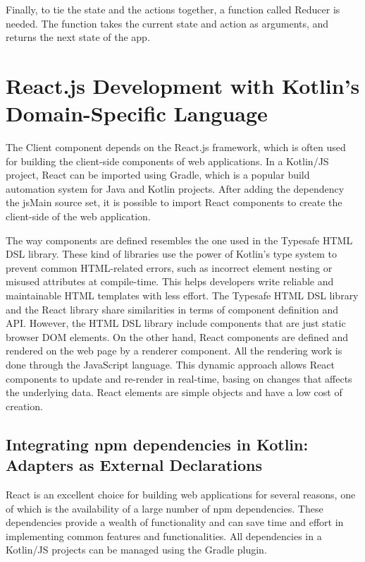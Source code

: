Finally, to tie the state and the actions together, a function called Reducer is needed. The function takes the current state and action as arguments, and returns the next state of the app.

\section{React.js Development with Kotlin's Domain-Specific Language}
\label{sec:react-js-development-with-kotlin-s-domain-specific-language}

The Client component depends on the React.js framework, which is often used for building the client-side components of web applications. In a Kotlin/JS project, React can be imported using Gradle, which is a popular build automation system for Java and Kotlin projects. After adding the dependency the jsMain source set, it is possible to import React components to create the client-side of the web application.\newline

The way components are defined resembles the one used in the Typesafe HTML DSL library. These kind of libraries use the power of Kotlin's type system to prevent common HTML-related errors, such as incorrect element nesting or misused attributes at compile-time. This helps developers write reliable and maintainable HTML templates with less effort. The Typesafe HTML DSL library and the React library share similarities in terms of component definition and API. However, the HTML DSL library include components that are just static browser DOM elements. On the other hand, React components are defined and rendered on the web page by a renderer component. All the rendering work is done through the JavaScript language. This dynamic approach allows React components to update and re-render in real-time, basing on changes that affects the underlying data. React elements are simple objects and have a low cost of creation.\newline

\subsection{Integrating npm dependencies in Kotlin: Adapters as External Declarations}
\label{ssec:integrating-npm-dependencies-in-kotlin-adapters-as-external-declarations}

React is an excellent choice for building web applications for several reasons, one of which is the availability of a large number of npm dependencies. These dependencies provide a wealth of functionality and can save time and effort in implementing common features and functionalities. All dependencies in a Kotlin/JS projects can be managed using the Gradle plugin.\newline

